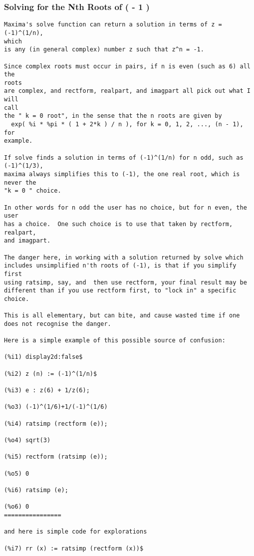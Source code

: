\documentclass[12pt]{article}
\begin{document}
\subsubsection{Solving for the Nth Roots of ( - 1 )}
\begin{verbatim}
Maxima's solve function can return a solution in terms of z = (-1)^(1/n), 
which
is any (in general complex) number z such that z^n = -1.

Since complex roots must occur in pairs, if n is even (such as 6) all the 
roots
are complex, and rectform, realpart, and imagpart all pick out what I will 
call
the " k = 0 root", in the sense that the n roots are given by
  exp( %i * %pi * ( 1 + 2*k ) / n ), for k = 0, 1, 2, ..., (n - 1), for 
example.

If solve finds a solution in terms of (-1)^(1/n) for n odd, such as 
(-1)^(1/3),
maxima always simplifies this to (-1), the one real root, which is never the
"k = 0 " choice.

In other words for n odd the user has no choice, but for n even, the user
has a choice.  One such choice is to use that taken by rectform, realpart,
and imagpart.

The danger here, in working with a solution returned by solve which
includes unsimplified n'th roots of (-1), is that if you simplify first
using ratsimp, say, and  then use rectform, your final result may be
different than if you use rectform first, to "lock in" a specific choice.

This is all elementary, but can bite, and cause wasted time if one
does not recognise the danger.

Here is a simple example of this possible source of confusion:

(%i1) display2d:false$

(%i2) z (n) := (-1)^(1/n)$

(%i3) e : z(6) + 1/z(6);

(%o3) (-1)^(1/6)+1/(-1)^(1/6)

(%i4) ratsimp (rectform (e));

(%o4) sqrt(3)

(%i5) rectform (ratsimp (e));

(%o5) 0

(%i6) ratsimp (e);

(%o6) 0
================

and here is simple code for explorations

(%i7) rr (x) := ratsimp (rectform (x))$


\end{verbatim}
\end{document}
